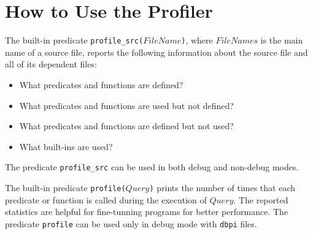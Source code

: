 {\section{How to Use the Profiler}
The built-in predicate \texttt{profile\_src($FileName$)}, where $FileNames$ is the main name of a source file, reports the following information about the source file and all of its dependent files:
\begin{itemize}
\item What predicates and functions are defined?
\item What predicates and functions are used but not defined?
\item What predicates and functions are  defined but not used?
\item What built-ins are used?
\end{itemize}
The predicate \texttt{profile\_src} can be used in both debug and non-debug modes.

The built-in predicate \texttt{profile($Query$)} prints the number of times that each predicate or function is called during the execution of $Query$.  The reported statistics are helpful for fine-tunning programs for better performance. The  predicate \texttt{profile} can be used only in debug mode with \texttt{dbpi} files.
}
\ignore{

}
